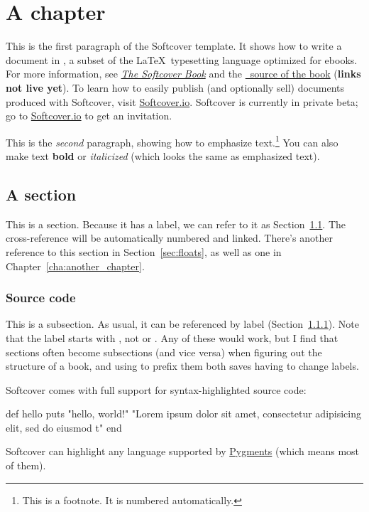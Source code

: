 \chapter{A chapter}
\label{cha:a_chapter}

This is the first paragraph of the Softcover template. It shows how to write a document in \PolyTeX, a subset of the \LaTeX\ typesetting language optimized for ebooks. For more information, see \href{http://manual.softcover.org/book}{\emph{The Softcover Book}} and the \href{http://example.com}{\PolyTeX\ source of the book} (\textbf{links not live yet}). To learn how to easily publish (and optionally sell) documents produced with Softcover, visit \href{http://softcover.io/}{Softcover.io}. Softcover is currently in private beta; go to \href{http://softcover.io/}{Softcover.io} to get an invitation.

This is the \emph{second} paragraph, showing how to emphasize text.\footnote{This is a footnote. It is numbered automatically.} You can also make text \textbf{bold} or \textit{italicized} (which looks the same as emphasized text).

\section{A section}
\label{sec:a_section}

This is a section. Because it has a label, we can refer to it as Section~\ref{sec:a_section}. The cross-reference will be automatically numbered and linked. There's another reference to this section in Section~\ref{sec:floats}, as well as one in Chapter~\ref{cha:another_chapter}.

\subsection{Source code}
\label{sec:source_code}

This is a subsection. As usual, it can be referenced by label (Section~\ref{sec:source_code}). Note that the label starts with , not  or . Any of these would work, but I find that sections often become subsections (and vice versa) when figuring out the structure of a book, and using  to prefix them both saves having to change labels.

Softcover comes with full support for syntax-highlighted source code:
\begin{code}
def hello
  puts "hello, world!"
  "Lorem ipsum dolor sit amet, consectetur adipisicing elit, sed do eiusmod t"
end
\end{code}
\noindent Softcover can highlight any language supported by \href{http://pygments.org/languages/}{Pygments} (which means most of them).

